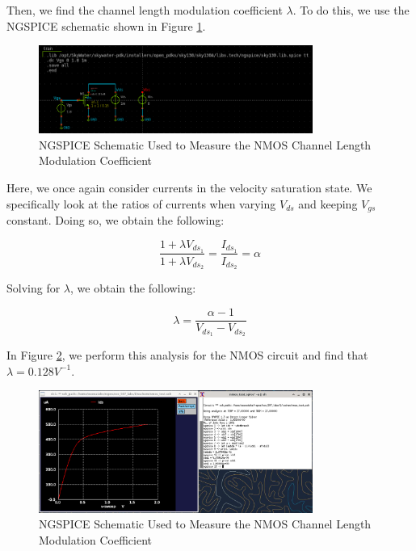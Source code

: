 \documentclass[fleqn]{article}
\begin{document}
	Then, we find the channel length modulation coefficient $\lambda$. To do this, we use the NGSPICE schematic shown in Figure \ref{fig::nmos_lambda_meas_schem}.
	
	\begin{figure}[H]
		\centerline{\includegraphics[width=0.8\textwidth]{nmos_vt_meas_schem.png}}
		\caption{NGSPICE Schematic Used to Measure the NMOS Channel Length Modulation Coefficient}
		\label{fig::nmos_lambda_meas_schem}
	\end{figure}
	
	\noindent Here, we once again consider currents in the velocity saturation state. We specifically look at the ratios of currents when varying $V_{ds}$ and keeping $V_{gs}$ constant. Doing so, we obtain the following:
	
	\begin{equation}
		\frac{1 + {\lambda}V_{ds_1}}{1 + {\lambda}V_{ds_2}} = \frac{I_{ds_1}}{I_{ds_2}} = \alpha
	\end{equation}
	
	\noindent Solving for $\lambda$, we obtain the following:
	
	\begin{equation}
		\lambda = \frac{\alpha - 1}{V_{ds_1} - V_{ds_2}}
	\end{equation}
	
	\noindent In Figure \ref{fig::nmos_lambda_meas}, we perform this analysis for the NMOS circuit and find that $\lambda = 0.128 V^{-1}$.
	
	\begin{figure}[H]
		\centerline{\includegraphics[width=0.8\textwidth]{nmos_lambda_meas.png}}
		\caption{NGSPICE Schematic Used to Measure the NMOS Channel Length Modulation Coefficient}
		\label{fig::nmos_lambda_meas}
	\end{figure}
	
\end{document}
